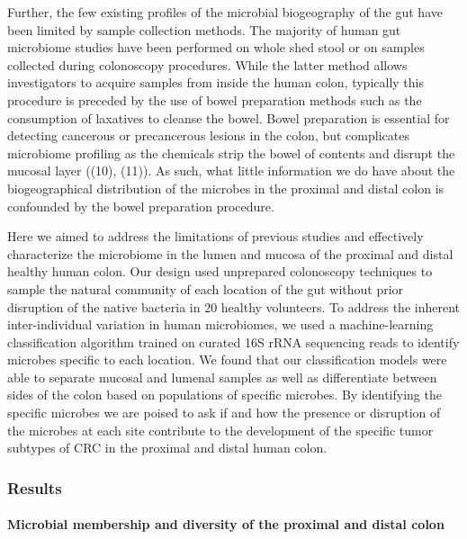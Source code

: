 \documentclass[11pt,]{article}
\let\oldparagraph\paragraph
\renewcommand{\paragraph}[1]{\oldparagraph{#1}\mbox{}}
\begin{document}
Further, the few existing profiles of the microbial biogeography of the
gut have been limited by sample collection methods. The majority of
human gut microbiome studies have been performed on whole shed stool or
on samples collected during colonoscopy procedures. While the latter
method allows investigators to acquire samples from inside the human
colon, typically this procedure is preceded by the use of bowel
preparation methods such as the consumption of laxatives to cleanse the
bowel. Bowel preparation is essential for detecting cancerous or
precancerous lesions in the colon, but complicates microbiome profiling
as the chemicals strip the bowel of contents and disrupt the mucosal
layer ((10), (11)). As such, what little information we do have about
the biogeographical distribution of the microbes in the proximal and
distal colon is confounded by the bowel preparation procedure.

Here we aimed to address the limitations of previous studies and
effectively characterize the microbiome in the lumen and mucosa of the
proximal and distal healthy human colon. Our design used unprepared
colonoscopy techniques to sample the natural community of each location
of the gut without prior disruption of the native bacteria in 20 healthy
volunteers. To address the inherent inter-individual variation in human
microbiomes, we used a machine-learning classification algorithm trained
on curated 16S rRNA sequencing reads to identify microbes specific to
each location. We found that our classification models were able to
separate mucosal and lumenal samples as well as differentiate between
sides of the colon based on populations of specific microbes. By
identifying the specific microbes we are poised to ask if and how the
presence or disruption of the microbes at each site contribute to the
development of the specific tumor subtypes of CRC in the proximal and
distal human colon.

\subsubsection{Results}\label{results}

\paragraph{Microbial membership and diversity of the proximal and distal
colon}\label{microbial-membership-and-diversity-of-the-proximal-and-distal-colon}
\end{document}
